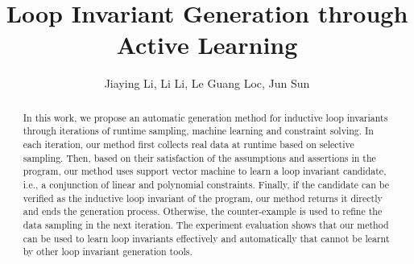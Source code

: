 \documentclass{llncs}
\begin{document}
\title{Loop Invariant Generation through Active Learning}
\author{
Jiaying Li, Li Li, Le Guang Loc, Jun Sun\\
}

\maketitle

\begin{abstract}
    In this work, we propose an automatic generation method for inductive loop invariants 
    through iterations of runtime sampling, machine learning and constraint solving. 
    In each iteration, our method first collects real data at runtime based on selective sampling. 
    Then, based on their satisfaction of the assumptions and assertions in the program, 
    our method uses support vector machine to learn a loop invariant candidate, 
    i.e., a conjunction of linear and polynomial constraints. 
    Finally, if the candidate can be verified as the inductive loop invariant of the program, 
    our method returns it directly and ends the generation process. 
    Otherwise, the counter-example is used to refine the data sampling in the next iteration. 
    The experiment evaluation shows that our method can be used to learn loop invariants 
    effectively and automatically that cannot be learnt by other loop invariant generation tools. 
\end{abstract}












\end{document}
